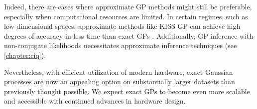 Indeed, there are cases where approximate GP methods might still be preferable, especially when computational resources are limited.
In certain regimes, such as low dimensional spaces, approximate methods like KISS-GP can achieve high degrees of accuracy in less time than exact GPs \cite{wilson2015kernel}.
Additionally, GP inference with non-conjugate likelihoods necessitates approximate inference techniques (see \cref{chapter:ciq}).

Nevertheless, with efficient utilization of modern hardware, exact Gaussian processes are now an appealing option on substantially larger datasets than previously thought possible.
We expect exact GPs to become even more scalable and accessible with continued advances in hardware design.
